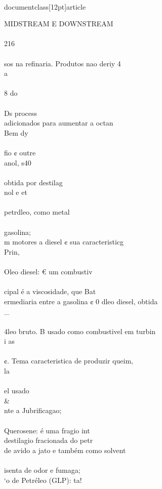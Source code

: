 \\documentclass[12pt]{article}
\begin{document}
MIDSTREAM E DOWNSTREAM\\
\\
216\\
\\
sos na refinaria. Produtos nao deriy 4\\
a\\
\\
8 do\\
\\
Ds process\\
adicionados para aumentar a octan\\
Bem dy\\
\\
fio ¢ outre\\
anol, s40\\
\\
obtida por destilag\\
nol e et\\
\\
petrdleo, como metal\\
\\
gasolina;\\
m motores a diesel ¢ sua caracteristicg\\
Prin,\\
\\
Oleo diesel: € um combustiv\\
\\
cipal é a viscosidade, que Bat\\
ermediaria entre a gasolina ¢ 0 dleo diesel, obtida \\_\\
\\
4leo bruto. B usado como combustivel em turbin\\
i as\\
\\
¢. Tema caracteristica de produzir queim,\\
la\\
\\
el usado \\&\\
nte a Jubrificagao;\\
\\
Querosene: é uma fragio int\\
destilagio fracionada do petr\\
de avido a jato e também como solvent\\
\\
isenta de odor e fumaga;\\
‘o de Petréleo (GLP): ta!\\
\end{document}
